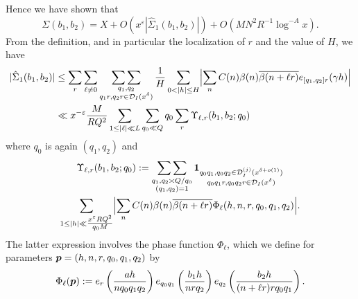 \documentclass[12pt,a4paper,reqno]{amsart}
\numberwithin{equation}{section}
\theoremstyle{plain}
\theoremstyle{definition}
\newcommand\eps{\varepsilon}
\newcommand{\DI}[3]{\mathcal{D}_{{#1}}^{({#2})}({#3})}
\newcommand{\DIone}[2]{\mathcal{D}_{{#1}}({#2})}
\newcommand{\uple}[1]{\text{\boldmath${#1}$}}
\newcommand\sumsum{\mathop{\sum\sum}\limits}
\renewcommand{\sim}{\asymp}
\newcommand{\onef}{\mathbf{1}}
\begin{document}

Hence we have shown that
\begin{equation}\label{eq-last-1}
\Sigma(b_1,b_2)=X+
O(x^{\eps}|\hat{\Sigma}_1(b_1,b_2)|)+O(MN^2R^{-1}\log^{-A} x).
\end{equation}
From the definition, and in particular the localization of $r$ and the
value of $H$, we have
\begin{align}
  |\hat{\Sigma}_1(b_1,b_2)|&\leq\sum_r\sum_{\ell\neq 0}
  \sumsum_{\substack{q_1,q_2\\q_1r,q_2r\in \DIone{I}{x^{\delta}}}}
  \frac{1}{H}\sum_{0<|h|\leq H}
  \Bigl|\sum_nC(n)\beta(n)\overline{\beta(n+\ell
    r)}e_{[q_1,q_2]r}(\gamma
  h)\Bigr|\nonumber\\
  &\ll x^{-\eps}\frac{M}{RQ^2}\sum_{1\leq |\ell|\ll
    L}\sum_{q_0\ll Q}q_0\sum_r\Upsilon_{\ell,r}(b_1,b_2;q_0)\label{eq-last}
\end{align}
where $q_0$ is again $(q_1,q_2)$ and 
\begin{multline}\label{eq-upsilon}
  \Upsilon_{\ell,r}(b_1,b_2;q_0):= \sumsum_{\substack{q_1,q_2\sim
      Q/q_0\\(q_1,q_2)=1}} \onef_{\substack{q_0q_1,q_0q_2
      \in\DI{I}{j}{x^{\delta+o(1)}} \\ q_0q_1 r,q_0q_2 r \in
      \DIone{I}{x^\delta} }}\\
  \sum_{1\leq |h|\ll \tfrac{x^{\eps}RQ^2}{q_0M}} \Bigl|\sum_{n} C(n)
  \beta(n)\overline{\beta(n+\ell r)}
  \Phi_{\ell}(h,n,r,q_0,q_1,q_2)\Bigr|.
\end{multline}
The latter expression involves the phase function $\Phi_{\ell}$, which we define for parameters
$\uple{p}=(h,n,r,q_0,q_1,q_2)$ by
\begin{equation}\label{eq-phiell}
  \Phi_{\ell}(\uple{p}):= e_r\left( \frac{ah}{nq_0q_1 q_2}
  \right) e_{q_0q_1}\left( \frac{b_1h}{n r q_2} \right) e_{q_2}\left(
    \frac{b_2 h}{(n+\ell r)  rq_0q_1} \right).
\end{equation}
\end{document}
